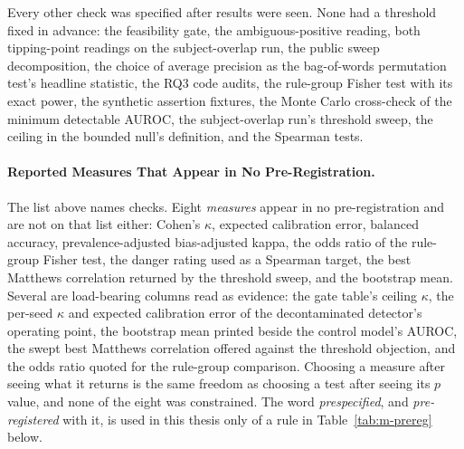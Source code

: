 Every other check was specified after results were seen. None had a threshold fixed in
advance: the feasibility gate, the ambiguous-positive reading, both tipping-point readings on the
subject-overlap run, the public sweep decomposition, the choice of average precision as the
bag-of-words permutation test's headline statistic, the RQ3 code audits, the rule-group
Fisher test with its exact power, the synthetic assertion fixtures, the Monte Carlo cross-check of the minimum detectable AUROC, the subject-overlap run's threshold sweep, the
ceiling in the bounded null's definition, and the Spearman tests.

\paragraph{Reported Measures That Appear in No Pre-Registration.} The list above names
checks. Eight \emph{measures} appear in no pre-registration and are not on that list either:
Cohen's $\kappa$, expected calibration error, balanced accuracy, prevalence-adjusted bias-adjusted kappa, the odds ratio of the rule-group Fisher test, the danger rating used as a
Spearman target, the best Matthews correlation returned by the threshold sweep, and the
bootstrap mean. Several are load-bearing columns read as evidence: the gate table's ceiling
$\kappa$, the per-seed $\kappa$ and expected calibration error of the decontaminated
detector's operating point, the bootstrap mean printed beside the control model's AUROC, the
swept best Matthews correlation offered against the threshold objection, and the odds ratio
quoted for the rule-group comparison. Choosing a measure after seeing what it returns is the
same freedom as choosing a test after seeing its $p$ value, and none of the eight was
constrained. The word \emph{prespecified}, and \emph{pre-registered} with it, is used in
this thesis only of a rule in Table~\ref{tab:m-prereg} below.

